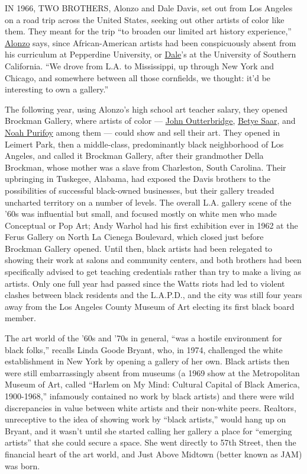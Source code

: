 IN 1966, TWO BROTHERS, Alonzo and Dale Davis, set out from Los Angeles
on a road trip across the United States, seeking out other artists of
color like them. They meant for the trip ``to broaden our limited art
history experience,''
\href{https://hammer.ucla.edu/now-dig-this/artists/alonzo-davis/}{Alonzo}
says, since African-American artists had been conspicuously absent from
his curriculum at Pepperdine University, or
\href{https://hammer.ucla.edu/now-dig-this/artists/dale-brockman-davis/}{Dale}'s
at the University of Southern California. ``We drove from L.A. to
Mississippi, up through New York and Chicago, and somewhere between all
those cornfields, we thought: it'd be interesting to own a gallery.''

The following year, using Alonzo's high school art teacher salary, they
opened Brockman Gallery, where artists of color ---
\href{http://www.jacktiltongallery.com/artists/outterbridge/}{John
Outterbridge}, \href{http://www.betyesaar.net/}{Betye Saar}, and
\href{http://www.noahpurifoy.com/about-noah/}{Noah Purifoy} among them
--- could show and sell their art. They opened in Leimert Park, then a
middle-class, predominantly black neighborhood of Los Angeles, and
called it Brockman Gallery, after their grandmother Della Brockman,
whose mother was a slave from Charleston, South Carolina. Their
upbringing in Tuskegee, Alabama, had exposed the Davis brothers to the
possibilities of successful black-owned businesses, but their gallery
treaded uncharted territory on a number of levels. The overall L.A.
gallery scene of the '60s was influential but small, and focused mostly
on white men who made Conceptual or Pop Art; Andy Warhol had his first
exhibition ever in 1962 at the Ferus Gallery on North La Cienega
Boulevard, which closed just before Brockman Gallery opened. Until then,
black artists had been relegated to showing their work at salons and
community centers, and both brothers had been specifically advised to
get teaching credentials rather than try to make a living as artists.
Only one full year had passed since the Watts riots had led to violent
clashes between black residents and the L.A.P.D., and the city was still
four years away from the Los Angeles County Museum of Art electing its
first black board member.

The art world of the '60s and '70s in general, ``was a hostile
environment for black folks,'' recalls Linda Goode Bryant, who, in 1974,
challenged the white establishment in New York by opening a gallery of
her own. Black artists then were still embarrassingly absent from
museums (a 1969 show at the Metropolitan Museum of Art, called ``Harlem
on My Mind: Cultural Capital of Black America, 1900-1968,'' infamously
contained no work by black artists) and there were wild discrepancies in
value between white artists and their non-white peers. Realtors,
unreceptive to the idea of showing work by ``black artists,'' would hang
up on Bryant, and it wasn't until she started calling her gallery a
place for ``emerging artists'' that she could secure a space. She went
directly to 57th Street, then the financial heart of the art world, and
Just Above Midtown (better known as JAM) was born.

